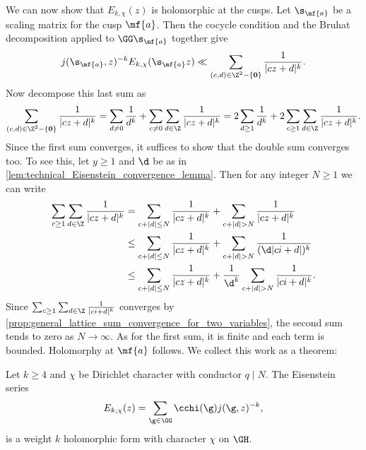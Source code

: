     We can now show that $E_{k,\chi}(z)$ is holomorphic at the cusps. Let $\s_{\mf{a}}$ be a scaling matrix for the cusp $\mf{a}$. Then the cocycle condition and the Bruhat decomposition applied to $\GG\s_{\mf{a}}$ together give
    \[
      j(\s_{\mf{a}},z)^{-k}E_{k,\chi}(\s_{\mf{a}}z) \ll \sum_{(c,d) \in \Z^{2}-\{\mathbf{0}\}}\frac{1}{|cz+d|^{k}}.
    \]
    Now decompose this last sum as
    \[
      \sum_{(c,d) \in \Z^{2}-\{\mathbf{0}\}}\frac{1}{|cz+d|^{k}} = \sum_{d \neq 0}\frac{1}{d^{k}}+\sum_{c \neq 0}\sum_{d \in \Z}\frac{1}{|cz+d|^{k}} = 2\sum_{d \ge 1}\frac{1}{d^{k}}+2\sum_{c \ge 1}\sum_{d \in \Z}\frac{1}{|cz+d|^{k}}.
    \]
    Since the first sum converges, it suffices to show that the double sum converges too. To see this, let $y \ge 1$ and $\d$ be as in \cref{lem:technical_Eisenstein_convergence_lemma}. Then for any integer $N \ge 1$ we can write
    \begin{align*}
      \sum_{c \ge 1}\sum_{d \in \Z}\frac{1}{|cz+d|^{k}} &= \sum_{c+|d| \le N}\frac{1}{|cz+d|^{k}}+\sum_{c+|d| > N}\frac{1}{|cz+d|^{k}} \\
      &\le \sum_{c+|d| \le N}\frac{1}{|cz+d|^{k}}+\sum_{c+|d| > N}\frac{1}{(\d|ci+d|)^{k}} \\
      &\le \sum_{c+|d| \le N}\frac{1}{|cz+d|^{k}}+\frac{1}{\d^{k}}\sum_{c+|d| > N}\frac{1}{|ci+d|^{k}}.
    \end{align*}
    Since $\sum_{c \ge 1}\sum_{d \in \Z}\frac{1}{|ci+d|^{k}}$ converges by \cref{prop:general_lattice_sum_convergence_for_two_variables}, the second sum tends to zero as $N \to \infty$. As for the first sum, it is finite and each term is bounded. Holomorphy at $\mf{a}$ follows. We collect this work as a theorem:

    \begin{theorem}
      Let $k \ge 4$ and $\chi$ be Dirichlet character with conductor $q \mid N$. The Eisenstein series
      \[
        E_{k,\chi}(z) = \sum_{\g \in \GG}\cchi(\g)j(\g,z)^{-k},
      \]
      is a weight $k$ holomorphic form with character $\chi$ on $\GH$.
    \end{theorem}

